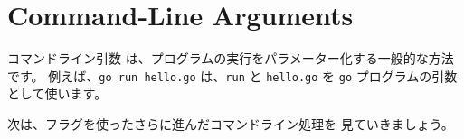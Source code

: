 \section{Command-Line Arguments}

コマンドライン引数 は、プログラムの実行をパラメーター化する一般的な方法です。 例えば、\texttt{go run hello.go} は、\texttt{run} と \texttt{hello.go} を \texttt{go} プログラムの引数として使います。




次は、フラグを使ったさらに進んだコマンドライン処理を 見ていきましょう。